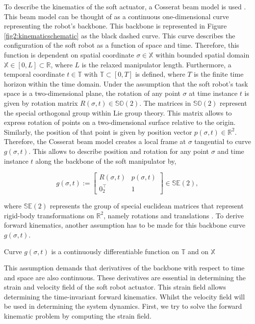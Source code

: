 To describe the kinematics of the soft actuator, a Cosserat beam model is used \cite{Boyer2019}. This beam model can be thought of as a continuous one-dimensional curve representing the robot's backbone. This backbone is represented in Figure \ref{fig2:kinematicschematic} as the black dashed curve. This curve describes the configuration of the soft robot as a function of space and time. Therefore, this function is dependent on spatial coordinate $\sigma \in \mathbb{X}$ within bounded spatial domain $\mathbb{X} \in [0,L] \subset \mathbb{R}$, where $L$ is the relaxed manipulator length. Furthermore, a temporal coordinate $t \in \mathbb{T}$ with $\mathbb{T} \subset [0,T]$ is defined, where $T$ is the finite time horizon within the time domain. Under the assumption that the soft robot's task space is a two-dimensional plane, the rotation of any point $\sigma$ at time instance $t$ is given by rotation matrix $R(\sigma,t) \in \mathbb{SO}(2)$. The matrices in $\mathbb{SO}(2)$ represent the special orthogonal group within Lie group theory. This matrix allows to express rotation of points on a two-dimensional surface relative to the origin. Similarly, the position of that point is given by position vector $p(\sigma,t) \in \mathbb{R}^2$. Therefore, the Cosserat beam model creates a local frame at $\sigma$ tangential to curve $g(\sigma,t)$. This allows to describe position and rotation for any point $\sigma$ and time instance $t$ along the backbone of the soft manipulator by,


\begin{equation}
    g(\sigma,t) := \begin{bmatrix}  R(\sigma,t) & p(\sigma,t) \\ 0_2^\top & 1 \end{bmatrix} \in \mathbb{SE}(2),
    \label{eq2:g}
\end{equation}

where $\mathbb{SE}(2)$ represents the group of special euclidean matrices that represent rigid-body transformations on $\mathbb{R}^2$, namely rotations and translations \cite{Sola2018}. To derive forward kinematics, another assumption has to be made for this backbone curve $g(\sigma,t)$.

\begin{theorem}
Curve  $g(\sigma,t)$ is a continuously differentiable function on $\mathbb{T}$ and on $\mathbb{X}$
\end{theorem}

This assumption demands that derivatives of the backbone with respect to time and space are also continuous. These derivatives are essential in determining the strain and velocity field of the soft robot actuator. This strain field allows determining the time-invariant forward kinematics. Whilst the velocity field will be used in determining the system dynamics. First, we try to solve the forward kinematic problem by computing the strain field.



